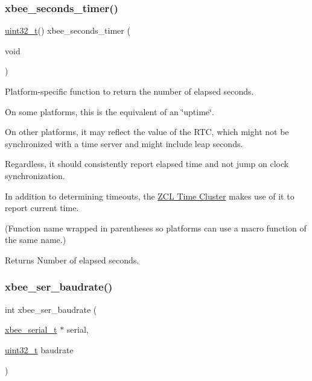 \subsubsection{\texorpdfstring{xbee\+\_\+seconds\+\_\+timer()}{xbee\_seconds\_timer()}}
{\footnotesize\ttfamily \hyperlink{group__hal__dos_ga09a1e304d66d35dd47daffee9731edaa}{uint32\+\_\+t}() xbee\+\_\+seconds\+\_\+timer (\begin{DoxyParamCaption}\item[{void}]{ }\end{DoxyParamCaption})}



Platform-\/specific function to return the number of elapsed seconds. 

On some platforms, this is the equivalent of an \char`\"{}uptime\char`\"{}.

On other platforms, it may reflect the value of the R\+TC, which might not be synchronized with a time server and might include leap seconds.

Regardless, it should consistently report elapsed time and not jump on clock synchronization.

In addition to determining timeouts, the \hyperlink{group__zcl__time}{Z\+CL Time Cluster} makes use of it to report current time.

(Function name wrapped in parentheses so platforms can use a macro function of the same name.)

\begin{DoxyReturn}{Returns}
Number of elapsed seconds. 
\end{DoxyReturn}
\mbox{\label{group__hal__hcs08_gab3c12543a07e0669b672c5cab54b0926}} 
\subsubsection{\texorpdfstring{xbee\+\_\+ser\+\_\+baudrate()}{xbee\_ser\_baudrate()}}
{\footnotesize\ttfamily int xbee\+\_\+ser\+\_\+baudrate (\begin{DoxyParamCaption}\item[{\hyperlink{structxbee__serial__t}{xbee\+\_\+serial\+\_\+t} $\ast$}]{serial,  }\item[{\hyperlink{group__hal__dos_ga09a1e304d66d35dd47daffee9731edaa}{uint32\+\_\+t}}]{baudrate }\end{DoxyParamCaption})}



